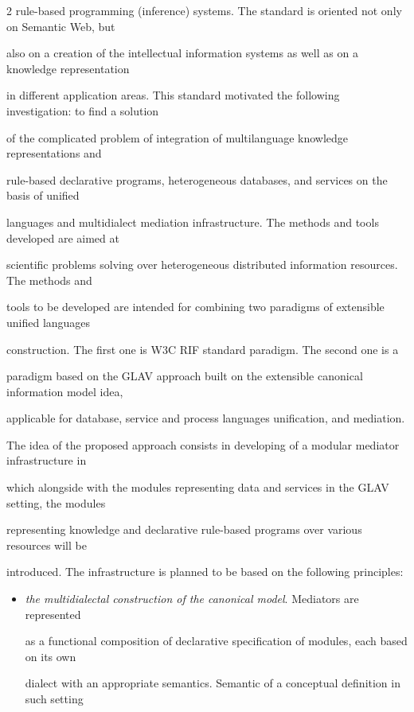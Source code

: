 \begin{multicols}{2}
rule-based programming (inference) systems. The standard is oriented not only on Semantic Web, but 


also on a creation of the intellectual information systems as well as on a knowledge representation 


in different application areas. This standard motivated the following investigation: to find a solution 


of the complicated problem of integration of multilanguage knowledge representations and 


rule-based declarative programs, heterogeneous databases, and services on the basis of unified 


languages and multidialect mediation infrastructure. The methods and tools developed are aimed at 


scientific problems solving over heterogeneous distributed information resources. The methods and 


tools to be developed are intended for combining two paradigms of extensible unified languages 


construction. The first one is W3C RIF standard paradigm. The second one is a 


paradigm based on the GLAV approach built on the extensible canonical information model idea, 


applicable for database, service and process languages unification, and mediation.





The idea of the proposed approach consists in developing of a modular mediator infrastructure in 


which alongside with the modules representing data and services in the GLAV setting, the modules 


representing knowledge and declarative rule-based programs over various resources will be 


introduced. The infrastructure is planned to be based on the following principles:


\begin{itemize}


\item \textit{the multidialectal construction of the canonical model}. Mediators are represented 


as a functional composition of declarative specification of modules, each based on its own 


dialect with an appropriate semantics. Semantic of a conceptual definition in such setting 



\end{itemize}
\end{multicols}
